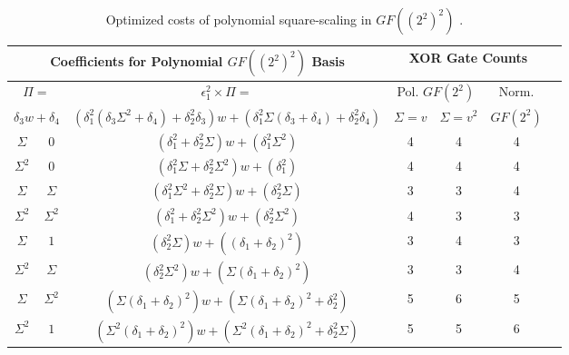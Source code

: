 \begin{table}[ht!]
\centering
\small
	\caption{Optimized costs of polynomial square-scaling in $GF((2^2)^2)$ \cite{Canright05-1}.}
	\label{tab:polynomialSquareScaleOptimize}
	\begin{tabular}{|c|c|c|c|c|c|c|} \hline
		\multicolumn{3}{|c|}{Coefficients for Polynomial $GF((2^2)^2)$ Basis} & \multicolumn{3}{c|}{XOR Gate Counts} \\ \hline
		\multicolumn{2}{|c}{$\Pi = $} & \multicolumn{1}{|c|}{$\epsilon_1^2 \times \Pi = $} & \multicolumn{2}{|c|}{Pol. $GF(2^2)$} & \multicolumn{1}{c|}{Norm.} \\
		\multicolumn{2}{|c|}{$\delta_3 w + \delta_4$} & \multicolumn{1}{c}{$(\delta_1^2(\delta_3\Sigma^2 + \delta_4) + \delta_2^2\delta_3) w + (\delta_1^2\Sigma(\delta_3 + \delta_4) + \delta_2^2\delta_4)$} & \multicolumn{1}{|c|}{$\Sigma = v$} & \multicolumn{1}{|c|}{$\Sigma = v^2$} & \multicolumn{1}{|c|}{$GF(2^2)$} \\ \hline

		$\Sigma$ & $0$          & $(\delta_1^2 + \delta_2^2\Sigma)w + (\delta_1^2\Sigma^2)$                    & 4 & 4 & 4 \\
		$\Sigma^2$ & $0$        & $(\delta_1^2\Sigma + \delta_2^2\Sigma^2)w + (\delta_1^2)$                    & 4 & 4 & 4  \\
		$\Sigma$ & $\Sigma$     & $(\delta_1^2\Sigma^2 + \delta_2^2\Sigma)w + (\delta_2^2\Sigma)$              & 3 & 3 & 4  \\
		$\Sigma^2$ & $\Sigma^2$ & $(\delta_1^2 + \delta_2^2\Sigma^2)w + (\delta_2^2\Sigma^2)$                  & 4 & 3 & 3  \\
		$\Sigma$ & $1$          & $(\delta_2^2\Sigma)w + ((\delta_1 + \delta_2)^2)$                            & 3 & 4 & 3  \\
		$\Sigma^2$ & $\Sigma$   & $(\delta_2^2\Sigma^2)w + (\Sigma(\delta_1 + \delta_2)^2)$                    & 3 & 3 & 4  \\
		$\Sigma$ & $\Sigma^2$   & $(\Sigma(\delta_1 + \delta_2)^2)w + (\Sigma(\delta_1 + \delta_2)^2 + \delta_2^2)$ & 5 & 6 & 5  \\
		$\Sigma^2$ & $1$        & $(\Sigma^2(\delta_1 + \delta_2)^2)w + (\Sigma^2(\delta_1 + \delta_2)^2 + \delta_2^2\Sigma)$ & 5 & 5 & 6 \\ \hline
    \end{tabular}
\end{table}

